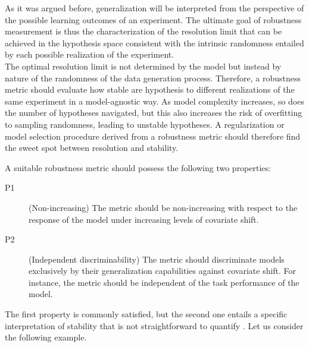 As it was argued before, generalization will be interpreted from the 
perspective of the possible learning outcomes of an experiment. The ultimate goal 
of robustness measurement is thus the characterization of the resolution
limit that can be achieved in the hypothesis space 
consistent with the intrinsic randomness entailed by each 
possible realization of the experiment. \\

The optimal resolution limit is not determined by the model but instead by 
nature of the randomness of the data generation process. 
Therefore, a robustness metric should evaluate how stable are hypothesis 
to different realizations of the same experiment in a model-agnostic way. As model 
complexity increases, so does the number of hypotheses navigated, but this
also increases the risk of overfitting to sampling randomness, leading to unstable 
hypotheses. A regularization or model selection procedure derived from a robustness metric 
should therefore find the sweet spot between resolution and stability. \\

\begin{proposition}\label{properties:robustness}
    A suitable robustness metric should possess the following two properties:
\begin{description}
    \item[P1](Non-increasing) The metric should be non-increasing with respect to the
    response of the model under increasing levels of covariate shift.
    \item[P2](Independent discriminability) The metric should discriminate models exclusively by their generalization capabilities against 
    covariate shift. For instance, the metric should be independent of the task
    performance of the model.
\end{description}
\end{proposition}

The first property is commonly satisfied, but the second one entails
a specific interpretation of stability that is not straightforward to
quantify \cite{buhmannPosteriorAgreementModel2022}. Let us consider
the following example.

